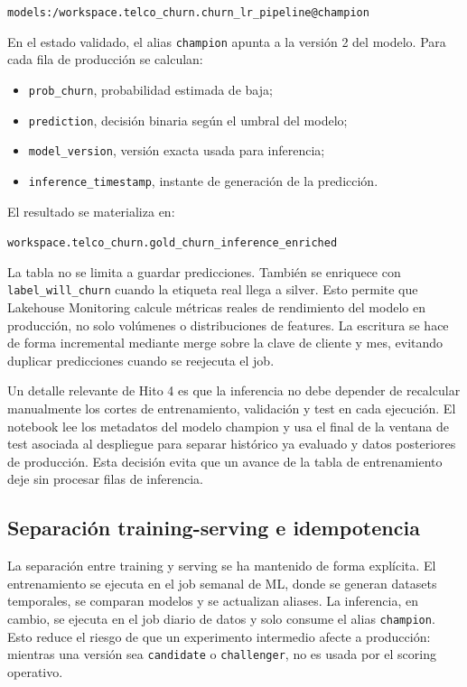 \documentclass[12pt,a4paper]{article}
\begin{document}
\nolinkurl{models:/workspace.telco_churn.churn_lr_pipeline@champion}\par

En el estado validado, el alias \nolinkurl{champion} apunta a la versión 2 del modelo. Para cada fila de producción se calculan:\par

\begin{itemize}
\item \nolinkurl{prob_churn}, probabilidad estimada de baja;
\item \nolinkurl{prediction}, decisión binaria según el umbral del modelo;
\item \nolinkurl{model_version}, versión exacta usada para inferencia;
\item \nolinkurl{inference_timestamp}, instante de generación de la predicción.
\end{itemize}

El resultado se materializa en:\par

\nolinkurl{workspace.telco_churn.gold_churn_inference_enriched}\par

La tabla no se limita a guardar predicciones. También se enriquece con \nolinkurl{label_will_churn} cuando la etiqueta real llega a silver. Esto permite que Lakehouse Monitoring calcule métricas reales de rendimiento del modelo en producción, no solo volúmenes o distribuciones de features. La escritura se hace de forma incremental mediante merge sobre la clave de cliente y mes, evitando duplicar predicciones cuando se reejecuta el job.\par

Un detalle relevante de Hito 4 es que la inferencia no debe depender de recalcular manualmente los cortes de entrenamiento, validación y test en cada ejecución. El notebook lee los metadatos del modelo champion y usa el final de la ventana de test asociada al despliegue para separar histórico ya evaluado y datos posteriores de producción. Esta decisión evita que un avance de la tabla de entrenamiento deje sin procesar filas de inferencia.\par

\subsection{Separación training-serving e idempotencia}

La separación entre training y serving se ha mantenido de forma explícita. El entrenamiento se ejecuta en el job semanal de ML, donde se generan datasets temporales, se comparan modelos y se actualizan aliases. La inferencia, en cambio, se ejecuta en el job diario de datos y solo consume el alias \nolinkurl{champion}. Esto reduce el riesgo de que un experimento intermedio afecte a producción: mientras una versión sea \nolinkurl{candidate} o \nolinkurl{challenger}, no es usada por el scoring operativo.\par
\end{document}
